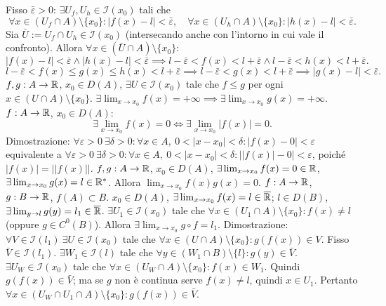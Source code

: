 Fisso $\bar\varepsilon>0$: $\exists U_f,U_h\in\mathcal I(x_0)$ tali che
\[\forall x\in(U_f\cap A)\setminus\{x_0\}:|f(x)-l|<\bar\varepsilon,\quad\forall x\in(U_h\cap A)\setminus\{x_0\}:|h(x)-l|<\bar\varepsilon.\]
Sia $\bar U:=U_f\cap U_h\in\mathcal I(x_0)$ (intersecando anche con l'intorno in cui vale il confronto).
Allora $\forall x\in(\bar U\cap A)\setminus\{x_0\}$:
\[|f(x)-l|<\bar\varepsilon\land|h(x)-l|<\bar\varepsilon\implies l-\bar\varepsilon<f(x)<l+\bar\varepsilon\land l-\bar\varepsilon<h(x)<l+\bar\varepsilon.\]
\[l-\bar\varepsilon<f(x)\le g(x)\le h(x)<l+\bar\varepsilon\implies l-\bar\varepsilon<g(x)<l+\bar\varepsilon\implies|g(x)-l|<\bar\varepsilon.\]
$f,g:A\to\mathbb R$, $x_0\in D(A)$, $\exists U\in\mathcal I(x_0)$ tale che $f\le g$ per ogni $x\in(U\cap A)\setminus\{x_0\}$.
$\exists\lim_{x\to x_0}f(x)=+\infty\implies\exists\lim_{x\to x_0}g(x)=+\infty$.
$f:A\to\mathbb R$, $x_0\in D(A)$:
\[\exists\lim_{x\to x_0}f(x)=0\iff\exists\lim_{x\to x_0}|f(x)|=0.\]
Dimostrazione:
$\forall\varepsilon>0\ \exists\delta>0:\forall x\in A,\ 0<|x-x_0|<\delta:|f(x)-0|<\varepsilon$
equivalente a $\forall\varepsilon>0\ \exists\delta>0:\forall x\in A,\ 0<|x-x_0|<\delta:\bigl||f(x)|-0\bigr|<\varepsilon$,
poiché $|f(x)|=\bigl||f(x)|\bigr|$.
$f,g:A\to\mathbb R$, $x_0\in D(A)$, $\exists\lim_{x\to x_0}f(x)=0\in\mathbb R$, $\exists\lim_{x\to x_0}g(x)=l\in\mathbb R^*$.
Allora $\lim_{x\to x_0}f(x)g(x)=0$.
$f:A\to\mathbb R$, $g:B\to\mathbb R$, $f(A)\subset B$.
$x_0\in D(A)$, $\exists\lim_{x\to x_0}f(x)=l\in\overline{\mathbb R}$;
$l\in D(B)$, $\exists\lim_{y\to l}g(y)=l_1\in\overline{\mathbb R}$.
$\exists U_1\in\mathcal I(x_0)$ tale che $\forall x\in(U_1\cap A)\setminus\{x_0\}:f(x)\ne l$ (oppure $g\in C^0(B)$).
Allora $\exists\lim_{x\to x_0}g\circ f=l_1$.
Dimostrazione: $\forall V\in\mathcal I(l_1)\ \exists U\in\mathcal I(x_0)$ tale che $\forall x\in(U\cap A)\setminus\{x_0\}:g(f(x))\in V$.
Fisso $\bar V\in\mathcal I(l_1)$.
$\exists W_1\in\mathcal I(l)$ tale che $\forall y\in(W_1\cap B)\setminus\{l\}:g(y)\in\bar V$.
$\exists U_W\in\mathcal I(x_0)$ tale che $\forall x\in(U_W\cap A)\setminus\{x_0\}:f(x)\in W_1$.
Quindi $g(f(x))\in\bar V$; ma se $g$ non è continua serve $f(x)\ne l$, quindi $x\in U_1$.
Pertanto $\forall x\in(U_W\cap U_1\cap A)\setminus\{x_0\}:g(f(x))\in\bar V$.
